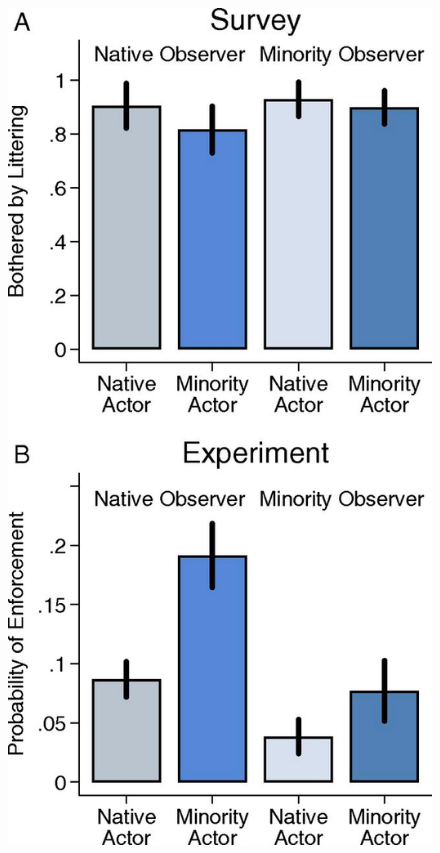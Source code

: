 \documentclass[12pt,english,dvipsnames,aspectratio=169,handout]{beamer}\usepackage[]{graphicx}\usepackage[]{xcolor}
\begin{document}
\begin{frame}
\begin{figure}[ht]
\begin{minipage}[b]{0.25\linewidth}
            \includegraphics[width=\textwidth]{../04-figures/12/18-w12_actor_results}
        \end{minipage}
    \end{figure}
\end{frame}
\end{document}
